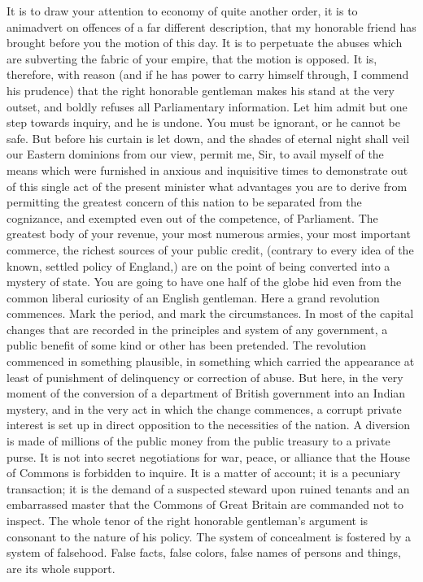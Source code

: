 It is to draw your attention to economy of quite another order, it is to animadvert on offences of a far different description, that my honorable friend has brought before you the motion of this day. It is to perpetuate the abuses which are subverting the fabric of your empire, that the motion is opposed. It is, therefore, with reason (and if he has power to carry himself through, I commend his prudence) that the right honorable gentleman makes his stand at the very outset, and boldly refuses all Parliamentary information. Let him admit but one step towards inquiry, and he is undone. You must be ignorant, or he cannot be safe. But before his curtain is let down, and the shades of eternal night shall veil our Eastern dominions from our view, permit me, Sir, to avail myself of the means which were furnished in anxious and inquisitive times to demonstrate out of this single act of the present minister what advantages you are to derive from permitting the greatest concern of this nation to be separated from the cognizance, and exempted even out of the competence, of Parliament. The greatest body of your revenue, your most numerous armies, your most important commerce, the richest sources of your public credit, (contrary to every idea of the known, settled policy of England,) are on the point of being converted into a mystery of state. You are going to have one half of the globe hid even from the common liberal curiosity of an English gentleman. Here a grand revolution commences. Mark the period, and mark the circumstances. In most of the capital changes that are recorded in the principles and system of any government, a public benefit of some kind or other has been pretended. The revolution commenced in something plausible, in something which carried the appearance at least of punishment of delinquency or correction of abuse. But here, in the very moment of the conversion of a department of British government into an Indian mystery, and in the very act in which the change commences, a corrupt private interest is set up in direct opposition to the necessities of the nation. A diversion is made of millions of the public money from the public treasury to a private purse. It is not into secret negotiations for war, peace, or alliance that the House of Commons is forbidden to inquire. It is a matter of account; it is a pecuniary transaction; it is the demand of a suspected steward upon ruined tenants and an embarrassed master that the Commons of Great Britain are commanded not to inspect. The whole tenor of the right honorable gentleman's argument is consonant to the nature of his policy. The system of concealment is fostered by a system of falsehood. False facts, false colors, false names of persons and things, are its whole support.

